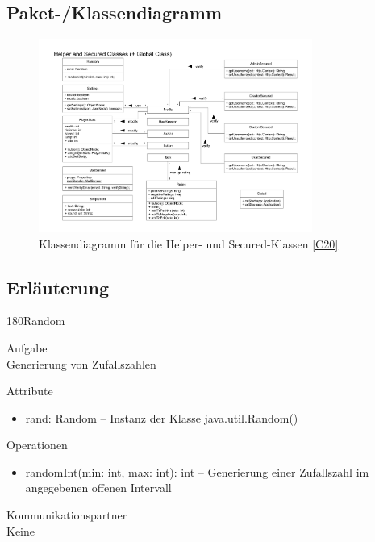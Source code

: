 \subsection{Paket-/Klassendiagramm}
\begin{figure}[h!]
\centering
\includegraphics[width=0.8\textwidth]{figures/KDHelper}
\caption{Klassendiagramm für die Helper- und Secured-Klassen \ref{C20}}
\label{classC10}
\end{figure}
\clearpage
\subsection{Erläuterung}
\begin{class}{180}{Random}
\item[Aufgabe]~\\
Generierung von Zufallszahlen
\item[Attribute]~\\
\begin{itemize}
\item rand: Random -- Instanz der Klasse java.util.Random()
\end{itemize}
\item[Operationen]~\\
\begin{itemize}
\item randomInt(min: int, max: int): int -- Generierung einer Zufallszahl im angegebenen offenen Intervall
\end{itemize}
\item[Kommunikationspartner]~\\
Keine
\end{class}

